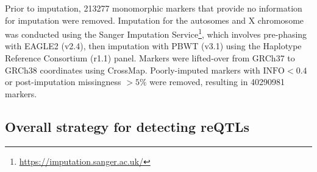 Prior to imputation, 213277 monomorphic markers that provide no information for imputation were removed.
Imputation for the autosomes and X chromosome was conducted using the Sanger Imputation Service\footnote{\url{https://imputation.sanger.ac.uk/}}, which involves pre-phasing with EAGLE2 (v2.4), then imputation with PBWT (v3.1) using the Haplotype Reference Consortium (r1.1) panel.
Markers were lifted-over from GRCh37 to GRCh38 coordinates using CrossMap.
Poorly-imputed markers with $\text{INFO} < 0.4$ or post-imputation missingness $> 5\%$ were removed, resulting in 40290981 markers.

\subsection{Overall strategy for detecting reQTLs}

